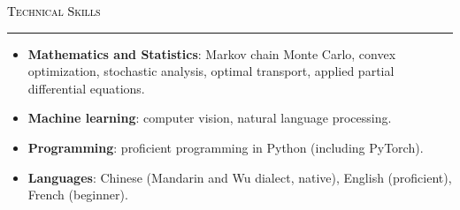 \documentclass{resume} %
\renewenvironment{rSection}[1]{
\sectionskip
\textcolor{black}{\textsc{#1}}
\sectionlineskip
\hrule
\begin{list}{}{
\setlength{\leftmargin}{1.5em}
}
\item[]
}{
\end{list}
}
\begin{document}
    
\begin{rSection}{Technical Skills} \itemsep -2pt
\begin{itemize}[leftmargin=0in]
    \item \textbf{Mathematics and Statistics}: Markov chain Monte Carlo, convex optimization, stochastic analysis, optimal transport, applied partial differential equations.
    \item \textbf{Machine learning}: computer vision, natural language processing.
    \item \textbf{Programming}: proficient programming in Python (including PyTorch).
    \item \textbf{Languages}: Chinese (Mandarin and Wu dialect, native), English (proficient), French (beginner).
\end{itemize}


\end{rSection}

\end{document}
